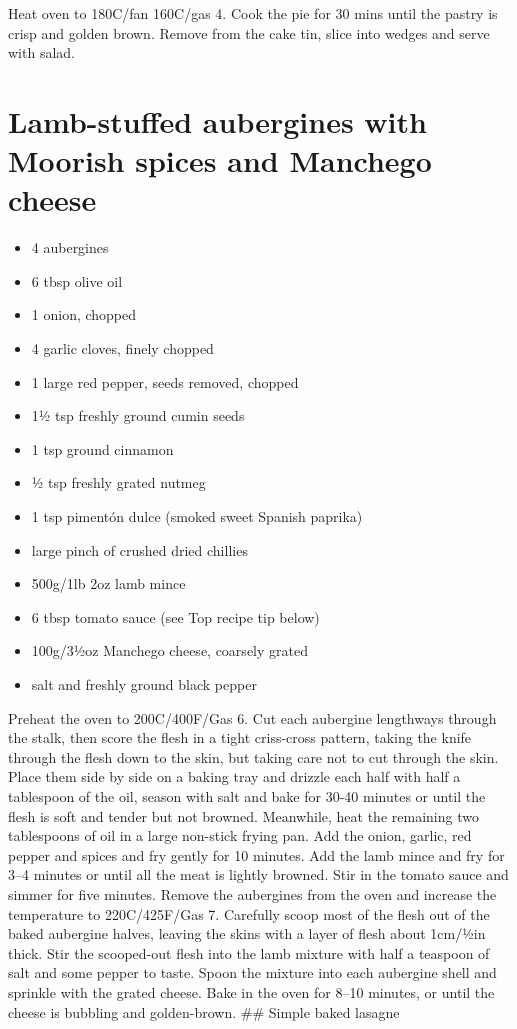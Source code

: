 \documentclass[
]{book}
\providecommand{\tightlist}{%
  \setlength{\itemsep}{0pt}\setlength{\parskip}{0pt}}
\begin{document}
Heat oven to 180C/fan 160C/gas 4. Cook the pie for 30 mins until the pastry is crisp and golden brown. Remove from the cake tin, slice into wedges and serve with salad.

\hypertarget{lamb-stuffed-aubergines-with-moorish-spices-and-manchego-cheese}{%
\section{Lamb-stuffed aubergines with Moorish spices and Manchego cheese}\label{lamb-stuffed-aubergines-with-moorish-spices-and-manchego-cheese}}

\begin{itemize}
\tightlist
\item
  4 aubergines
\item
  6 tbsp olive oil
\item
  1 onion, chopped
\item
  4 garlic cloves, finely chopped
\item
  1 large red pepper, seeds removed, chopped
\item
  1½ tsp freshly ground cumin seeds
\item
  1 tsp ground cinnamon
\item
  ½ tsp freshly grated nutmeg
\item
  1 tsp pimentón dulce (smoked sweet Spanish paprika)
\item
  large pinch of crushed dried chillies
\item
  500g/1lb 2oz lamb mince
\item
  6 tbsp tomato sauce (see Top recipe tip below)
\item
  100g/3½oz Manchego cheese, coarsely grated
\item
  salt and freshly ground black pepper
\end{itemize}

Preheat the oven to 200C/400F/Gas 6.
Cut each aubergine lengthways through the stalk, then score the flesh in a tight criss-cross pattern, taking the knife through the flesh down to the skin, but taking care not to cut through the skin. Place them side by side on a baking tray and drizzle each half with half a tablespoon of the oil, season with salt and bake for 30-40 minutes or until the flesh is soft and tender but not browned.
Meanwhile, heat the remaining two tablespoons of oil in a large non-stick frying pan. Add the onion, garlic, red pepper and spices and fry gently for 10 minutes. Add the lamb mince and fry for 3--4 minutes or until all the meat is lightly browned. Stir in the tomato sauce and simmer for five minutes.
Remove the aubergines from the oven and increase the temperature to 220C/425F/Gas 7. Carefully scoop most of the flesh out of the baked aubergine halves, leaving the skins with a layer of flesh about 1cm/½in thick. Stir the scooped-out flesh into the lamb mixture with half a teaspoon of salt and some pepper to taste. Spoon the mixture into each aubergine shell and sprinkle with the grated cheese. Bake in the oven for 8--10 minutes, or until the cheese is bubbling and golden-brown.
\#\# Simple baked lasagne
\end{document}
